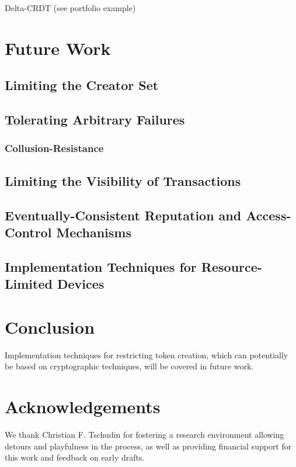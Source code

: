 \documentclass[9pt, oneside]{article}   	%
\begin{document}
Delta-CRDT (see portfolio example)~\cite{Almeida2018delta}
 
\section{Future Work}
 
\subsection{Limiting the Creator Set}

\subsection{Tolerating Arbitrary Failures}

	\subsubsection{Collusion-Resistance}

\subsection{Limiting the Visibility of Transactions}

\subsection{Eventually-Consistent Reputation and Access-Control Mechanisms}

\subsection{Implementation Techniques for Resource-Limited Devices}

\section{Conclusion}
\label{sec:conclusion}

Implementation techniques for restricting token creation, which can potentially be based on cryptographic techniques, will be covered in future work.

\section{Acknowledgements}
\label{sec:acknowledgements}

We thank Christian F. Tschudin for fostering a research environment allowing detours and playfulness in the process, as well as providing financial support for this work and feedback on early drafts. 
\end{document}

